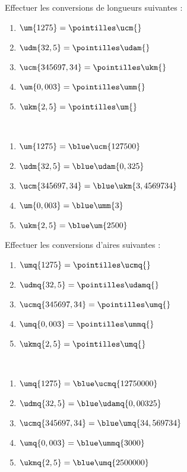 \begin{colonne*exercice}

\begin{exercice} %
   Effectuer les conversions de longueurs suivantes :
   \begin{enumerate}
      \item $\um{1275} =\pointilles \ucm{}$
      \item $\udm{32,5} =\pointilles \udam{}$
      \item $\ucm{345697,34} =\pointilles \ukm{}$
      \item $\um{0,003} =\pointilles \umm{}$
      \item $\ukm{2,5} =\pointilles \um{}$
   \end{enumerate}
\end{exercice}

\begin{corrige}
   \ \\ [-5mm]
   \begin{enumerate}
      \item $\um{1275} =\blue\ucm{127500}$
      \item $\udm{32,5} =\blue\udam{0,325}$
      \item $\ucm{345697,34} =\blue\ukm{3,4569734}$
      \item $\um{0,003} =\blue\umm{3}$
      \item $\ukm{2,5} =\blue\um{2500}$
   \end{enumerate}
\end{corrige}

\medskip


\begin{exercice} %
   Effectuer les conversions d'aires suivantes :
   \begin{enumerate}
      \item $\umq{1275} =\pointilles \ucmq{}$
      \item $\udmq{32,5} =\pointilles\udamq{}$
      \item $\ucmq{345697,34} =\pointilles\umq{}$
      \item $\umq{0,003} =\pointilles\ummq{}$
      \item $\ukmq{2,5} =\pointilles \umq{}$
   \end{enumerate}
\end{exercice}

\begin{corrige}
\ \\ [-5mm]
   \begin{enumerate}
      \item $\umq{1275} =\blue\ucmq{12750000}$
      \item $\udmq{32,5} =\blue\udamq{0,00325}$
      \item $\ucmq{345697,34} =\blue\umq{34,569734}$
      \item $\umq{0,003} =\blue\ummq{3000}$
      \item $\ukmq{2,5} =\blue\umq{2500000}$
   \end{enumerate}
\end{corrige}


\end{colonne*exercice}
